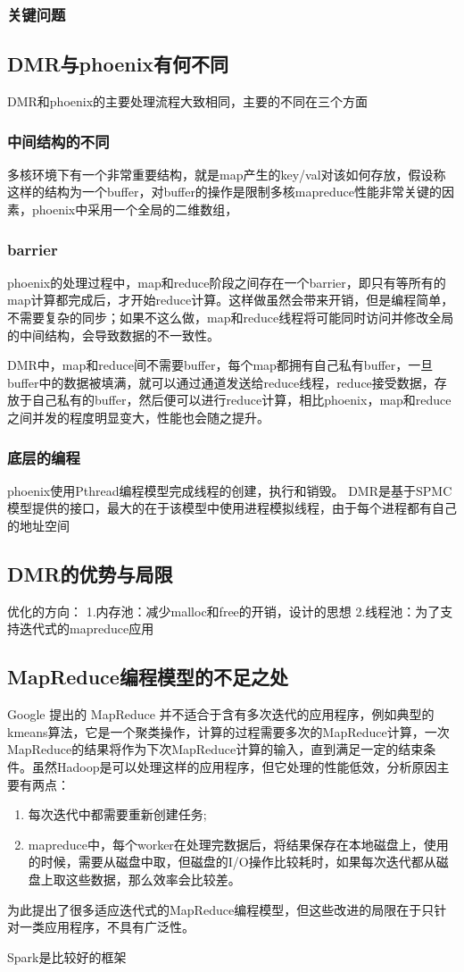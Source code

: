 \subsubsection{关键问题}


\subsection{DMR与phoenix有何不同}
DMR和phoenix的主要处理流程大致相同，主要的不同在三个方面

\subsubsection{中间结构的不同}
多核环境下有一个非常重要结构，就是map产生的key/val对该如何存放，假设称这样的结构为一个buffer，对buffer的操作是限制多核mapreduce性能非常关键的因素，phoenix中采用一个全局的二维数组，

\subsubsection{barrier}
phoenix的处理过程中，map和reduce阶段之间存在一个barrier，即只有等所有的map计算都完成后，才开始reduce计算。这样做虽然会带来开销，但是编程简单，不需要复杂的同步；如果不这么做，map和reduce线程将可能同时访问并修改全局的中间结构，会导致数据的不一致性。

DMR中，map和reduce间不需要buffer，每个map都拥有自己私有buffer，一旦buffer中的数据被填满，就可以通过通道发送给reduce线程，reduce接受数据，存放于自己私有的buffer，然后便可以进行reduce计算，相比phoenix，map和reduce之间并发的程度明显变大，性能也会随之提升。

\subsubsection{底层的编程}
{\color{red}
phoenix使用Pthread编程模型完成线程的创建，执行和销毁。
DMR是基于SPMC模型提供的接口，最大的在于该模型中使用进程模拟线程，由于每个进程都有自己的地址空间}

\subsection{DMR的优势与局限}
优化的方向：
  1.内存池：减少malloc和free的开销，设计的思想
  2.线程池：为了支持迭代式的mapreduce应用

\subsection{MapReduce编程模型的不足之处}
Google 提出的 MapReduce 并不适合于含有多次迭代的应用程序，例如典型的kmeans算法，它是一个聚类操作，计算的过程需要多次的MapReduce计算，一次MapReduce的结果将作为下次MapReduce计算的输入，直到满足一定的结束条件。虽然Hadoop是可以处理这样的应用程序，但它处理的性能低效，分析原因主要有两点：
\begin{enumerate}
  \item 每次迭代中都需要重新创建任务;
  \item mapreduce中，每个worker在处理完数据后，将结果保存在本地磁盘上，使用的时候，需要从磁盘中取，但磁盘的I/O操作比较耗时，如果每次迭代都从磁盘上取这些数据，那么效率会比较差。
\end{enumerate}

为此提出了很多适应迭代式的MapReduce编程模型，但这些改进的局限在于只针对一类应用程序，不具有广泛性。

Spark是比较好的框架
